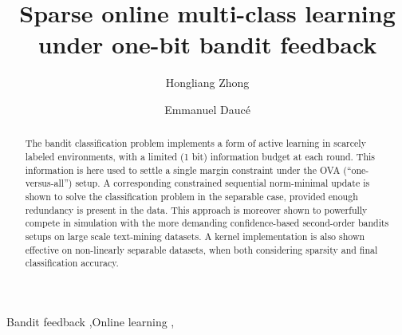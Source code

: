 \documentclass[preprint,12pt,authoryear]{elsarticle}
\begin{document}
\begin{frontmatter}



\title{Sparse online multi-class learning under one-bit bandit feedback}


\author[centrale,lif]{Hongliang Zhong}
\author[centrale,ins]{Emmanuel Dauc\'e }

\address[centrale]{Ecole Centrale de Marseille}
\address[lif]{Laboratoire d'informatique Fondamentale}
\address[ins]{Institut de Neurosciences des Syst\`emes}


\begin{abstract}
The bandit classification problem implements a form of active learning in scarcely labeled environments, with a limited (1 bit) information budget at each round. This information is here used to settle a single margin constraint under the OVA (``one-versus-all'') setup. A corresponding constrained sequential norm-minimal update is shown to solve the classification problem in the separable case, provided enough redundancy is present in the data. This approach is moreover shown to powerfully compete in simulation with the more demanding confidence-based second-order bandits setups on large scale text-mining datasets.
A kernel implementation is also shown effective on non-linearly separable datasets, when both considering sparsity and final classification accuracy.
\end{abstract}

\begin{keyword}
Bandit feedback \sep Online learning \sep 


\end{keyword}

\end{frontmatter}
\end{document}
